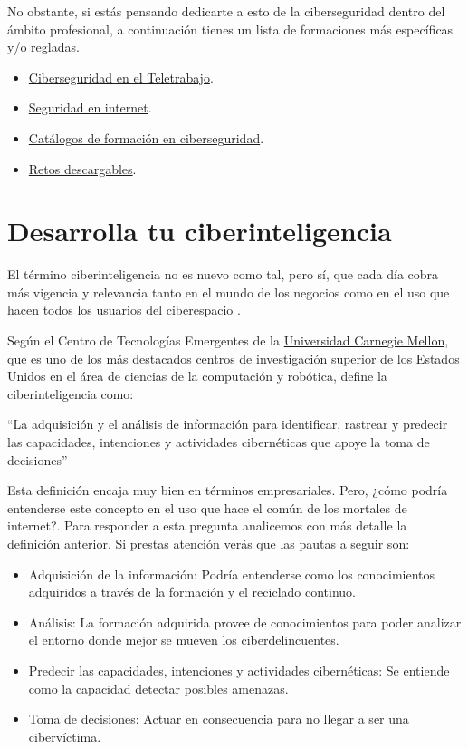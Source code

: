 \documentclass[
  a4paper,
  openany]{book}
\begin{document}
No obstante, si estás pensando dedicarte a esto de la ciberseguridad dentro del ámbito profesional, a continuación tienes un lista de formaciones más específicas y/o regladas.

\begin{itemize}
\item
  \href{https://learndigital.withgoogle.com/activate/course/cybersecurity-remote-work}{Ciberseguridad en el Teletrabajo}.
\item
  \href{https://www.cualifica2.es/cursos/Curso-Seguridad-En-Internet}{Seguridad en internet}.
\item
  \href{https://www.incibe.es/catalogos-formacion-ciberseguridad}{Catálogos de formación en ciberseguridad}.
\item
  \href{https://www.incibe.es/academiahacker/retosdescargables}{Retos descargables}.
\end{itemize}

\hypertarget{desarrolla-tu-ciberinteligencia}{%
\section{Desarrolla tu ciberinteligencia}\label{desarrolla-tu-ciberinteligencia}}

El término ciberinteligencia no es nuevo como tal, pero sí, que cada día cobra más vigencia y relevancia tanto en el mundo de los negocios como en el uso que hacen todos los usuarios del ciberespacio \citep{ciberinteligencia}.

Según el Centro de Tecnologías Emergentes de la \href{https://es.wikipedia.org/wiki/Universidad_Carnegie_Mellon}{Universidad Carnegie Mellon}, que es uno de los más destacados centros de investigación superior de los Estados Unidos en el área de ciencias de la computación y robótica, define la ciberinteligencia como:

``La adquisición y el análisis de información para identificar, rastrear y predecir las capacidades, intenciones y actividades cibernéticas que apoye la toma de decisiones''

Esta definición encaja muy bien en términos empresariales. Pero, ¿cómo podría entenderse este concepto en el uso que hace el común de los mortales de internet?. Para responder a esta pregunta analicemos con más detalle la definición anterior. Si prestas atención verás que las pautas a seguir son:

\begin{itemize}
\item
  Adquisición de la información: Podría entenderse como los conocimientos adquiridos a través de la formación y el reciclado continuo.
\item
  Análisis: La formación adquirida provee de conocimientos para poder analizar el entorno donde mejor se mueven los ciberdelincuentes.
\item
  Predecir las capacidades, intenciones y actividades cibernéticas: Se entiende como la capacidad detectar posibles amenazas.
\item
  Toma de decisiones: Actuar en consecuencia para no llegar a ser una cibervíctima.
\end{itemize}
\end{document}
